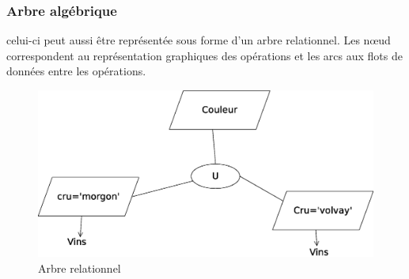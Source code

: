 \documentclass[12pt,a4paper,openany]{book}
\begin{document}
	\subsubsection{Arbre algébrique}
	celui-ci peut aussi être représentée sous forme d'un arbre relationnel. Les n\oe{}ud correspondent au représentation graphiques des opérations et
	les arcs aux flots de données entre les opérations.
	\begin{figure}[H]
		\centering
		\includegraphics[width=15cm]{arbreRelationnel.eps}
		\caption{Arbre relationnel}
	\end{figure}
\end{document}
